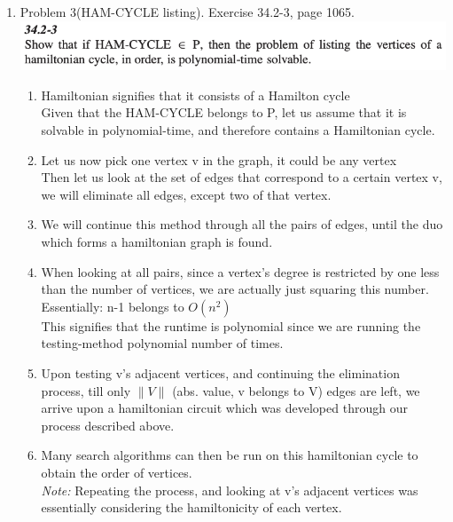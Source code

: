 \documentclass[11pt]{article}
\begin{document}
\begin{enumerate}
\item Problem 3(HAM-CYCLE listing). Exercise 34.2-3, page 1065.\\
\includegraphics[scale=1]{HW5_Q3.png}
    \begin{enumerate}
        \item Hamiltonian signifies that it consists of a Hamilton cycle\\
        Given that the HAM-CYCLE belongs to P, let us assume that it is solvable in polynomial-time, and therefore contains a Hamiltonian cycle.
        \item Let us now pick one vertex v in the graph, it could be any vertex\\
        Then let us look at the set of edges that correspond to a certain vertex v, we will eliminate all edges, except two of that vertex.
        \item We will continue this method through all the pairs of edges, until the duo which forms a hamiltonian graph is found.
        \item When looking at all pairs, since a vertex's degree is restricted by one less than the number of vertices, we are actually just squaring this number. Essentially: n-1 belongs to $O(n^2)$\\
        This signifies that the runtime is polynomial since we are running the testing-method polynomial number of times.
        \item Upon testing v's adjacent vertices, and continuing the elimination process, till only $\|V\|$ (abs. value, v belongs to V) edges are left, we arrive upon a hamiltonian circuit which was developed through our process described above.
        \item Many search algorithms can then be run on this hamiltonian cycle to obtain the order of vertices. \\
        
        \textit{Note: }Repeating the process, and looking at v's adjacent vertices was essentially considering the hamiltonicity of each vertex.
    \end{enumerate}

\pagebreak


\end{enumerate}
\end{document}
